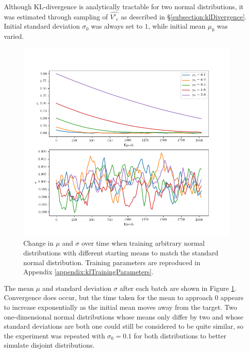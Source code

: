 \documentclass[../../main.tex]{subfiles}
\begin{document}
Although KL-divergence is analytically tractable for two normal distributions, it was estimated through sampling of $\hat{V'_c}$ as described in \S\ref{subsection:klDivergence}.
Initial standard deviation $\sigma_0$ was always set to $1$, while initial mean $\mu_0$ was varied.
\begin{figure}[H]
    \begin{center}
    \includegraphics[width=\textwidth]{broadKLDivergence}
    \caption{
        Change in $\mu$ and $\sigma$ over time when training arbitrary normal distributions with different starting means to match the standard normal distribution.
        Training parameters are reproduced in Appendix \ref{appendix:klTrainingParameters}.
    }
    \label{fig:broadKLDivergence}
    \end{center}
\end{figure}
The mean $\mu$ and standard deviation $\sigma$ after each batch are shown in Figure \ref{fig:broadKLDivergence}.
Convergence does occur, but the time taken for the mean to approach $0$ appears to increase exponentially as the initial mean moves away from the target.
Two one-dimensional normal distributions whose means only differ by two and whose standard deviations are both one could still be considered to be quite similar, so the experiment was repeated with $\sigma_0=0.1$ for both distributions to better simulate disjoint distributions.
\end{document}
